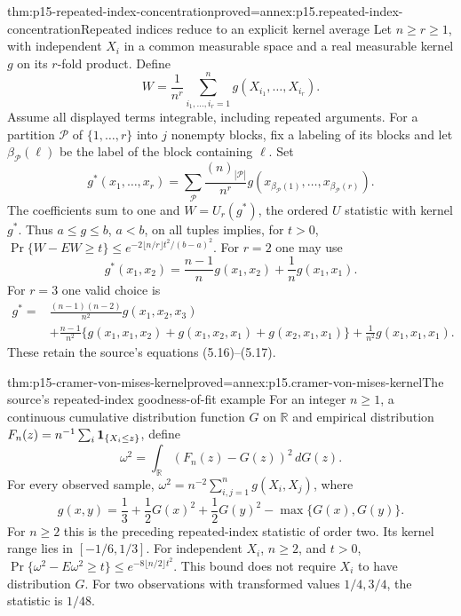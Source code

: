 \begin{hbtheorem}{thm:p15-repeated-index-concentration}{proved=annex:p15.repeated-index-concentration}{Repeated indices reduce to an explicit kernel average}
Let \(n\geq r\geq1\), with independent \(X_i\) in a common measurable
space and a real measurable kernel \(g\) on its \(r\)-fold product.
Define
\[
 W=\frac1{n^r}\sum_{i_1,\ldots,i_r=1}^n
                       g(X_{i_1},\ldots,X_{i_r}).
\]
Assume all displayed terms integrable, including repeated arguments.
For a partition \(\mathcal P\) of \(\{1,\ldots,r\}\) into \(j\) nonempty
blocks, fix a labeling of its blocks and let \(\beta_{\mathcal P}(\ell)\)
be the label of the block containing \(\ell\). Set
\[
 g^*(x_1,\ldots,x_r)=
 \sum_{\mathcal P}\frac{(n)_{|\mathcal P|}}{n^r}
 g(x_{\beta_{\mathcal P}(1)},\ldots,x_{\beta_{\mathcal P}(r)}).
\]
The coefficients sum to one and
\(W=U_r(g^*)\), the ordered \(U\) statistic with kernel \(g^*\).
Thus \(a\leq g\leq b\), \(a<b\), on all tuples implies, for \(t>0\),
\(\Pr\{W-EW\geq t\}\leq e^{-2\lfloor n/r\rfloor t^2/(b-a)^2}\).
For \(r=2\) one may use
\[
 g^*(x_1,x_2)=\frac{n-1}{n}g(x_1,x_2)+\frac1n g(x_1,x_1).
\]
For \(r=3\) one valid choice is
\[
\begin{split}
g^*={}&\frac{(n-1)(n-2)}{n^2}g(x_1,x_2,x_3)\\
&+\frac{n-1}{n^2}\{g(x_1,x_1,x_2)+g(x_1,x_2,x_1)+g(x_2,x_1,x_1)\}
+\frac1{n^2}g(x_1,x_1,x_1).
\end{split}
\]
These retain the source's equations (5.16)--(5.17).
\end{hbtheorem}

\begin{hbtheorem}{thm:p15-cramer-von-mises-kernel}{proved=annex:p15.cramer-von-mises-kernel}{The source's repeated-index goodness-of-fit example}
For an integer \(n\geq1\), a continuous cumulative distribution function
\(G\) on \(\mathbb R\)
and empirical distribution \(F_n(z)=n^{-1}\sum_i{\bf1}_{\{X_i\leq z\}}\),
define
\[
 \omega^2=\int_{\mathbb R}(F_n(z)-G(z))^2\,dG(z).
\]
For every observed sample,
\(\omega^2=n^{-2}\sum_{i,j=1}^n g(X_i,X_j)\), where
\[
 g(x,y)=\frac13+\frac12G(x)^2+\frac12G(y)^2-\max\{G(x),G(y)\}.
\]
For \(n\geq2\) this is the preceding repeated-index statistic of order two.
Its kernel range lies in \([-1/6,1/3]\). For independent \(X_i\),
\(n\geq2\), and \(t>0\),
\(\Pr\{\omega^2-E\omega^2\geq t\}\leq e^{-8\lfloor n/2\rfloor t^2}\).
This bound does not require \(X_i\) to have distribution \(G\).
For two observations with transformed values \(1/4,3/4\),
the statistic is \(1/48\).
\end{hbtheorem}

